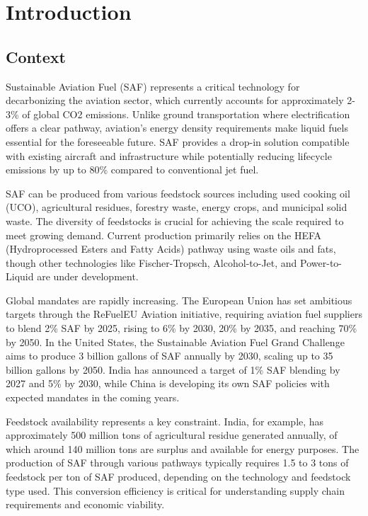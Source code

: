 \documentclass[10.5pt]{article}
\begin{document}
\setcounter{page}{1}


\section{Introduction}

\subsection{Context}

Sustainable Aviation Fuel (SAF) represents a critical technology for decarbonizing the aviation sector, which currently accounts for approximately 2-3\% of global CO2 emissions. Unlike ground transportation where electrification offers a clear pathway, aviation's energy density requirements make liquid fuels essential for the foreseeable future. SAF provides a drop-in solution compatible with existing aircraft and infrastructure while potentially reducing lifecycle emissions by up to 80\% compared to conventional jet fuel.

SAF can be produced from various feedstock sources including used cooking oil (UCO), agricultural residues, forestry waste, energy crops, and municipal solid waste. The diversity of feedstocks is crucial for achieving the scale required to meet growing demand. Current production primarily relies on the HEFA (Hydroprocessed Esters and Fatty Acids) pathway using waste oils and fats, though other technologies like Fischer-Tropsch, Alcohol-to-Jet, and Power-to-Liquid are under development.

Global mandates are rapidly increasing. The European Union has set ambitious targets through the ReFuelEU Aviation initiative, requiring aviation fuel suppliers to blend 2\% SAF by 2025, rising to 6\% by 2030, 20\% by 2035, and reaching 70\% by 2050. In the United States, the Sustainable Aviation Fuel Grand Challenge aims to produce 3 billion gallons of SAF annually by 2030, scaling up to 35 billion gallons by 2050. India has announced a target of 1\% SAF blending by 2027 and 5\% by 2030, while China is developing its own SAF policies with expected mandates in the coming years.

Feedstock availability represents a key constraint. India, for example, has approximately 500 million tons of agricultural residue generated annually, of which around 140 million tons are surplus and available for energy purposes. The production of SAF through various pathways typically requires 1.5 to 3 tons of feedstock per ton of SAF produced, depending on the technology and feedstock type used. This conversion efficiency is critical for understanding supply chain requirements and economic viability.
\end{document}
